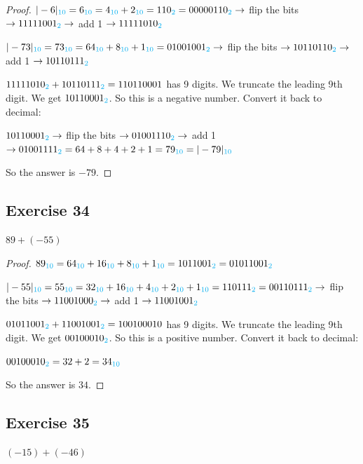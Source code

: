 \documentclass[14pt]{extarticle}
\newcommand{\base}[1]{{\color{cyan}#1}}
\begin{document}
\begin{proof} 
$|-6|_\base{10} = 6_\base{10} = 4_\base{10} + 2_\base{10} = 110_\base{2} = 00000110_\base{2} \to$ flip the bits $\to 11111001_\base{2} \to$ add 1 $\to 11111010_\base{2}$

$|-73|_\base{10} = 73_\base{10} = 64_\base{10} + 8_\base{10} + 1_\base{10} = 01001001_\base{2} \to$ flip the bits $\to 10110110_\base{2} \to$ add 1 $\to 10110111_\base{2}$

$11111010_\base{2} + 10110111_\base{2} = 1 1011 0001$ has 9 digits. We truncate the leading 9th digit. We get $10110001_\base{2}$. So this is a negative number. Convert it back to decimal:

$10110001_\base{2} \to$ flip the bits $\to 01001110_\base{2} \to$ add 1 $\to 01001111_\base{2} = 64 + 8 + 4 + 2 + 1 = 79_\base{10} = |-79|_\base{10}$

So the answer is $-79$. 
\end{proof}

\subsection{Exercise 34} 
$89 + (-55)$

\begin{proof} 
$89_\base{10} = 64_\base{10} + 16_\base{10} + 8_\base{10} +
1_\base{10} = 1011001_\base{2} = 01011001_\base{2}$

$|-55|_\base{10} = 55_\base{10} = 32_\base{10} + 16_\base{10} + 4_\base{10} + 2_\base{10} + 1_\base{10} = 110111_\base{2} = 00110111_\base{2} \to$ flip the bits $\to 11001000_\base{2} \to$ add 1 $\to 11001001_\base{2}$

$01011001_\base{2} + 11001001_\base{2} = 1 0010 0010$ has 9 digits. We truncate the leading 9th digit. We get $00100010_\base{2}$. So this is a positive number. Convert it back to decimal:

$00100010_\base{2} = 32 + 2 = 34_\base{10}$

So the answer is $34$. 
\end{proof}

\subsection{Exercise 35} 
$(-15) + (-46)$
\end{document}
